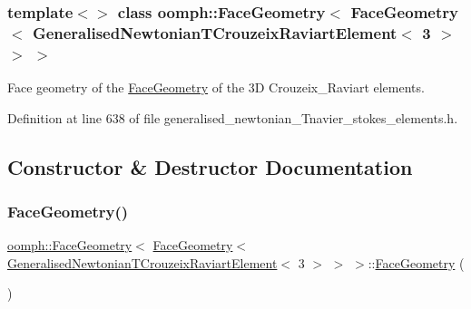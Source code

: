 \subsubsection*{template$<$$>$\newline
class oomph\+::\+Face\+Geometry$<$ Face\+Geometry$<$ Generalised\+Newtonian\+T\+Crouzeix\+Raviart\+Element$<$ 3 $>$ $>$ $>$}

Face geometry of the \hyperlink{classoomph_1_1FaceGeometry}{Face\+Geometry} of the 3D Crouzeix\+\_\+\+Raviart elements. 

Definition at line 638 of file generalised\+\_\+newtonian\+\_\+\+Tnavier\+\_\+stokes\+\_\+elements.\+h.



\subsection{Constructor \& Destructor Documentation}
\mbox{\label{classoomph_1_1FaceGeometry_3_01FaceGeometry_3_01GeneralisedNewtonianTCrouzeixRaviartElement_3_013_01_4_01_4_01_4_a6b071928cc28dfc1203dd24cdd341745}} 
\subsubsection{\texorpdfstring{Face\+Geometry()}{FaceGeometry()}}
{\footnotesize\ttfamily \hyperlink{classoomph_1_1FaceGeometry}{oomph\+::\+Face\+Geometry}$<$ \hyperlink{classoomph_1_1FaceGeometry}{Face\+Geometry}$<$ \hyperlink{classoomph_1_1GeneralisedNewtonianTCrouzeixRaviartElement}{Generalised\+Newtonian\+T\+Crouzeix\+Raviart\+Element}$<$ 3 $>$ $>$ $>$\+::\hyperlink{classoomph_1_1FaceGeometry}{Face\+Geometry} (\begin{DoxyParamCaption}{ }\end{DoxyParamCaption})\hspace{0.3cm}{\ttfamily [inline]}}



